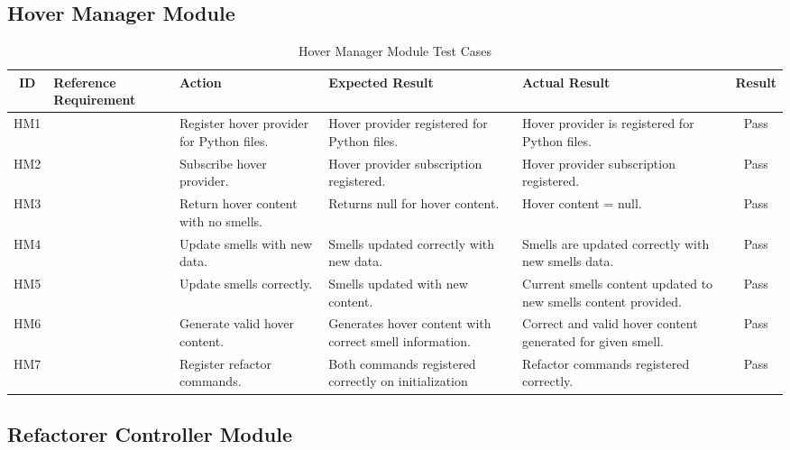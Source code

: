 \documentclass[12pt, titlepage]{article}
\begin{document}
\subsection{Hover Manager Module}
\begin{table}[h!]
\centering
\begin{tabular}{|c|p{2.5cm}|p{3cm}|p{3.5cm}|p{3.5cm}|c|}
\hline
\textbf{ID} & \textbf{Reference Requirement} & \textbf{Action} & \textbf{Expected Result} & \textbf{Actual Result} & \textbf{Result} \\ \hline

HM1 & & Register hover provider for Python files. & Hover provider registered for Python files. & Hover provider is registered for Python files. & \cellcolor{green!20} Pass \\ \hline
HM2 & & Subscribe hover provider. & Hover provider subscription registered. & Hover provider subscription registered. & \cellcolor{green!20} Pass \\ \hline
HM3 & & Return hover content with no smells. & Returns null for hover content. & Hover content = null. & \cellcolor{green!20} Pass \\ \hline
HM4 & & Update smells with new data. & Smells updated correctly with new data. & Smells are updated correctly with new smells data. & \cellcolor{green!20} Pass \\ \hline
HM5 & & Update smells correctly. & Smells updated with new content. & Current smells content updated to new smells content provided.  & \cellcolor{green!20} Pass \\ \hline
HM6 & & Generate valid hover content. & Generates hover content with correct smell information. & Correct and valid hover content generated for given smell. & \cellcolor{green!20} Pass \\ \hline
HM7 & & Register refactor commands. & Both commands registered correctly on initialization & Refactor commands registered correctly. & \cellcolor{green!20} Pass \\ \hline

\end{tabular}
\caption{Hover Manager Module Test Cases}
\label{table:hover_manager_tests}
\end{table}


\subsection{Refactorer Controller Module}

\renewcommand{\arraystretch}{1.2} %
\end{document}
